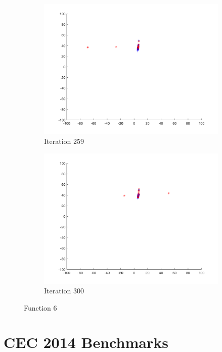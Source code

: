 \begin{figure}
\begin{subfigure}[b]{0.4\textwidth}
    \includegraphics[width=\textwidth]{img/smpl/rosn2d-9-100/loa-iter-259}
    \caption{Iteration 259}
    \label{fig:s6-iter-6}
  \end{subfigure}
  \begin{subfigure}[b]{0.4\textwidth}
    \includegraphics[width=\textwidth]{img/smpl/rosn2d-9-100/loa-iter-300}
    \caption{Iteration 300}
    \label{fig:s6-iter-7}
  \end{subfigure}
  \caption{Function 6}
\end{figure}

\section{CEC 2014 Benchmarks}

